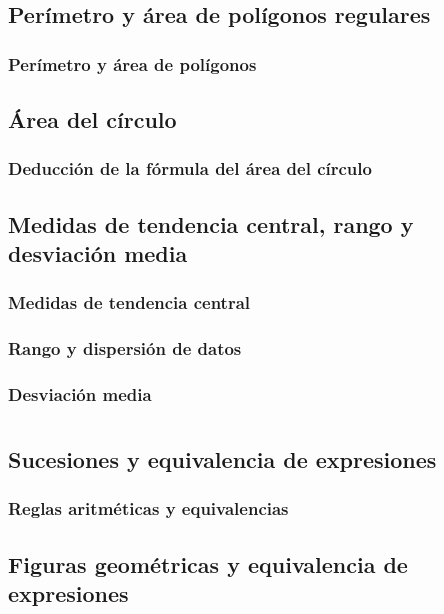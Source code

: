 \documentclass[11pt]{book}
\begin{document}
\section{Per\'imetro y \'area de pol\'igonos regulares}
\subsection{Per\'imetro y \'area de pol\'igonos}

\section{\'Area del c\'irculo}
\subsection{Deducción de la f\'ormula del \'area del c\'irculo}


\section{Medidas de tendencia central, rango y desviación media}
\subsection{Medidas de tendencia central}
\subsection{Rango y dispersi\'on de datos}
\subsection{Desviaci\'on media}


\chapter{}

\section{Sucesiones y equivalencia de expresiones}
\subsection{Reglas aritméticas y equivalencias}

\section{Figuras geométricas y equivalencia de expresiones}
\end{document}
